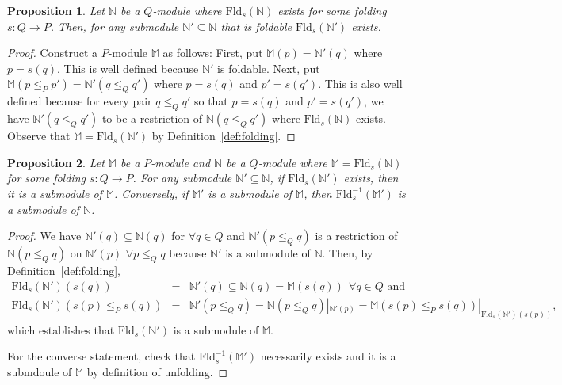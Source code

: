 \documentclass[11pt]{article}
\theoremstyle{plain}%
\newtheorem{proposition}{Proposition}[section]
\newcommand{\N}{\mathbb{N}}
\newcommand{\M}{\mathbb{M}}
\newcommand{\Fld}{\mathrm{Fld}}
\begin{document}
\begin{proposition}
    Let $\N$ be a $Q$-module where $\Fld_s(\N)$ exists for some folding
    $s: Q\rightarrow P$. Then, for any submodule $\N'\subseteq \N$ that is foldable $\Fld_s(\N')$ exists. 
    \label{prop:foldexist}
\end{proposition}
\begin{proof}
    Construct a $P$-module $\M$ as follows: First, put $\M(p)=\N'(q)$ where $p=s(q)$. This is well defined because $\N'$ is foldable. Next, put
    $\M(p\leq_P p')=\N'(q\leq_Q q')$ where $p=s(q)$ and $p'=s(q')$. This is also well defined because for every pair $q\leq_Q q'$ so that $p=s(q)$ and
    $p'=s(q')$, we have
    $\N'(q\leq_Q q')$ to be a restriction of $\N(q\leq_Q q')$ where $\Fld_s(\N)$ exists. Observe that $\M=\Fld_s(\N')$ by Definition~\ref{def:folding}.
\end{proof}
\begin{proposition}
    Let $\M$ be a $P$-module and $\N$ be a $Q$-module where
    $\M=\Fld_s(\N)$ for some folding $s:Q\rightarrow P$. For any submodule $\N'\subseteq \N$, if $\Fld_s(\N')$ exists, then it is a submodule of $\M$. Conversely, if $\M'$ is a submodule of $\M$, then $\Fld_s^{-1}(\M')$ is a submodule of $\N$.
    \label{prop:submodule}
\end{proposition}
\begin{proof}
We have $\N'(q)\subseteq \N(q)$ for $\forall q\in Q$ and
$\N'(p \leq_Q q)$ is a restriction of $\N(p\leq_Q q)$ on $\N'(p)$ $\forall p\leq _Q q$ because $\N'$ is a submodule of $\N$. Then, by Definition~\ref{def:folding},
\begin{eqnarray*}
\Fld_s(\N')(s(q))&=&\N'(q)\subseteq\N(q)=\M(s(q))~~\forall q\in Q \mbox{ and }\\
\Fld_s(\N')(s(p)\leq_P s(q))&=&\N'(p\leq_Q q) =\N(p\leq_Q q)|_{\N'(p)}=\M(s(p)\leq_P s(q))|_{\Fld_s(\N')(s(p))},
\end{eqnarray*}
which establishes that $\Fld_s(\N')$ is a submodule of $\M$.

For the converse statement, check that $\Fld_s^{-1}(\M')$ necessarily exists and it is a submdoule of $\M$ by definition of unfolding.
\end{proof}
\end{document}
